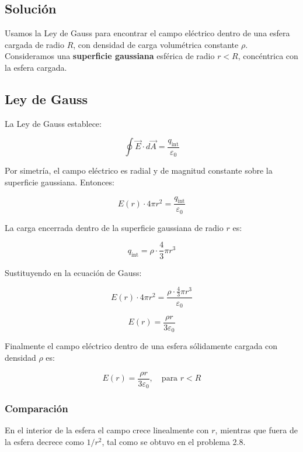 \documentclass[12pt]{article}
\begin{document}
\subsection*{Solución}

Usamos la Ley de Gauss para encontrar el campo eléctrico dentro de una esfera cargada de radio \( R \), con densidad de carga volumétrica constante \( \rho \). Consideramos una \textbf{superficie gaussiana} esférica de radio \( r < R \), concéntrica con la esfera cargada.

\subsection*{Ley de Gauss}

La Ley de Gauss establece:

\[
\oint \vec{E} \cdot d\vec{A} = \frac{q_{\text{int}}}{\varepsilon_0}
\]

Por simetría, el campo eléctrico es radial y de magnitud constante sobre la superficie gaussiana. Entonces:

\[
E(r) \cdot 4\pi r^2 = \frac{q_{\text{int}}}{\varepsilon_0}
\]

La carga encerrada dentro de la superficie gaussiana de radio \( r \) es:

\[
q_{\text{int}} = \rho \cdot \frac{4}{3} \pi r^3
\]

Sustituyendo en la ecuación de Gauss:

\[
E(r) \cdot 4\pi r^2 = \frac{\rho \cdot \frac{4}{3} \pi r^3}{\varepsilon_0}
\]

\[
E(r) = \frac{\rho r}{3 \varepsilon_0}
\]

Finalmente el campo eléctrico dentro de una esfera sólidamente cargada con densidad \( \rho \) es:

\[
\boxed{E(r) = \frac{\rho r}{3 \varepsilon_0}, \quad \text{para } r < R}
\]

\subsubsection*{Comparación }

En el interior de la esfera el campo crece linealmente con \( r \), mientras que fuera de la esfera decrece como \( 1/r^2 \), tal como se obtuvo en el problema 2.8.


\end{document}
